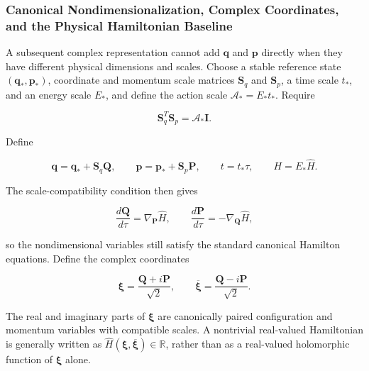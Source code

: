 \subsubsection{Canonical Nondimensionalization, Complex Coordinates, and the Physical Hamiltonian Baseline}\label{sec:hamiltonian-3-7-1}

A subsequent complex representation cannot add \(\mathbf{q}\) and \(\mathbf{p}\) directly when they have different physical dimensions and scales. Choose a stable reference state \(\left(\mathbf{q}_{*},\mathbf{p}_{*}\right)\), coordinate and momentum scale matrices \(\mathbf{S}_{q}\) and \(\mathbf{S}_{p}\), a time scale \(t_{*}\), and an energy scale \(E_{*}\), and define the action scale \(\mathcal{A}_{*}=E_{*}t_{*}\). Require

\begin{equation}
\label{eq:hamiltonian-3-65}
\boxed{\mathbf{S}_{q}^{T}\mathbf{S}_{p} = \mathcal{A}_{*}\mathbf{I}.}
\end{equation}

Define

\begin{equation}
\label{eq:hamiltonian-3-66}
\mathbf{q} = \mathbf{q}_{*} + \mathbf{S}_{q}\mathbf{Q},\quad\quad\mathbf{p} = \mathbf{p}_{*} + \mathbf{S}_{p}\mathbf{P},\quad\quad t = t_{*}\tau,\quad\quad H = E_{*}\widehat{H}.
\end{equation}

The scale-compatibility condition then gives

\begin{equation}
\label{eq:hamiltonian-3-67}
\frac{d\mathbf{Q}}{d\tau} = \nabla_{\mathbf{P}}\widehat{H},\quad\quad\frac{d\mathbf{P}}{d\tau} = - \nabla_{\mathbf{Q}}\widehat{H},
\end{equation}

so the nondimensional variables still satisfy the standard canonical Hamilton equations. Define the complex coordinates\cite{MarsdenRatiu1999MechanicsSymmetry,Arnold1989ClassicalMechanics}

\begin{equation}
\label{eq:hamiltonian-3-68}
\boxed{\bm{\xi} = \frac{\mathbf{Q} + i\mathbf{P}}{\sqrt{2}},\quad\quad\overline{\bm{\xi}} = \frac{\mathbf{Q} - i\mathbf{P}}{\sqrt{2}}.}
\end{equation}

The real and imaginary parts of \(\bm{\xi}\) are canonically paired configuration and momentum variables with compatible scales. A nontrivial real-valued Hamiltonian is generally written as \(\widehat{H}\left( \bm{\xi},\overline{\bm{\xi}} \right) \in \mathbb{R}\), rather than as a real-valued holomorphic function of \(\bm{\xi}\) alone.\cite{Trabelsi2018DeepComplex,Hirose2012CVNN}

